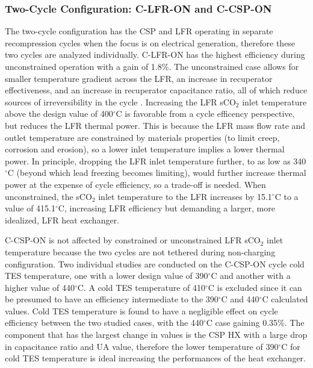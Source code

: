 \begin{paracol}{2}
\linenumbers
\switchcolumn


\subsubsection{Two-Cycle Configuration: C-LFR-ON and C-CSP-ON}

The two-cycle configuration has the CSP and LFR operating in separate recompression cycles when the focus is on electrical generation, therefore these two cycles are analyzed individually. C-LFR-ON has the highest efficiency during unconstrained operation with a gain of 1.8\%. The unconstrained case allows for smaller temperature gradient across the LFR, an increase in recuperator effectiveness, and an increase in recuperator capacitance ratio, all of which reduce sources of irreversibility in the cycle \cite{klein_nellis_2011}. Increasing the LFR sCO$_2$ inlet temperature above the design value of 400$^{\circ}$C is favorable from a cycle efficency perspective, but reduces the LFR thermal power. This is because the LFR mass flow rate and outlet temperature are constrained by materials properties (to limit creep, corrosion and erosion), so a lower inlet temperature implies a lower thermal power. In principle, dropping the LFR inlet temperature further, to as low as 340$^{\circ}$C (beyond which lead freezing becomes limiting), would further increase thermal power at the expense of cycle efficiency, so a trade-off is needed. When unconstrained, the sCO$_2$ inlet temperature to the LFR increases by 15.1$^{\circ}$C to a value of 415.1$^{\circ}$C, increasing LFR efficiency but demanding a larger, more idealized, LFR heat exchanger.   

C-CSP-ON is not affected by constrained or unconstrained LFR sCO$_2$ inlet temperature because the two cycles are not tethered during non-charging configuration.  Two individual studies are conducted on the C-CSP-ON cycle cold TES temperature, one with a lower design value of 390$^{\circ}$C and another with a higher value of 440$^{\circ}$C. A cold TES temperature of 410$^{\circ}$C is excluded since it can be presumed to have an efficiency intermediate to the 390$^{\circ}$C and 440$^{\circ}$C calculated values. Cold TES temperature is found to have a negligible effect on cycle efficiency between the two studied cases, with the 440$^{\circ}$C case gaining 0.35\%. The component that has the largest change in values is the CSP HX with a large drop in capacitance ratio and UA value, therefore the lower temperature of 390$^{\circ}$C for cold TES temperature is ideal increasing the performances of the heat exchanger. 



\end{paracol}
